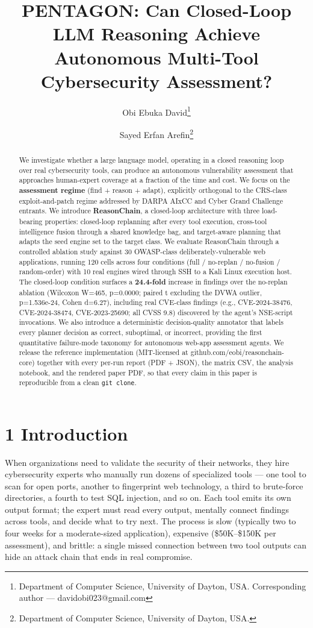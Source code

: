 \documentclass[
]{article}
\title{PENTAGON: Can Closed-Loop LLM Reasoning Achieve Autonomous
Multi-Tool Cybersecurity Assessment?}
\author{Obi Ebuka David\footnote{Department of Computer Science,
  University of Dayton, USA. Corresponding author ---
  davidobi023@gmail.com} \and Sayed Erfan Arefin\footnote{Department of
  Computer Science, University of Dayton, USA.}}
\date{}
\begin{document}
\maketitle
\begin{abstract}
We investigate whether a large language model, operating in a closed
reasoning loop over real cybersecurity tools, can produce an autonomous
vulnerability assessment that approaches human-expert coverage at a
fraction of the time and cost. We focus on the \textbf{assessment
regime} (find + reason + adapt), explicitly orthogonal to the CRS-class
exploit-and-patch regime addressed by DARPA AIxCC and Cyber Grand
Challenge entrants. We introduce \textbf{ReasonChain}, a closed-loop
architecture with three load-bearing properties: closed-loop replanning
after every tool execution, cross-tool intelligence fusion through a
shared knowledge bag, and target-aware planning that adapts the seed
engine set to the target class. We evaluate ReasonChain through a
controlled ablation study against 30 OWASP-class deliberately-vulnerable
web applications, running 120 cells across four conditions (full /
no-replan / no-fusion / random-order) with 10 real engines wired through
SSH to a Kali Linux execution host. The closed-loop condition surfaces a
\textbf{24.4-fold} increase in findings over the no-replan ablation
(Wilcoxon W=465, p=0.0000; paired t excluding the DVWA outlier,
p=1.536e-24, Cohen d=6.27), including real CVE-class findings (e.g.,
CVE-2024-38476, CVE-2024-38474, CVE-2023-25690; all CVSS 9.8) discovered
by the agent's NSE-script invocations. We also introduce a deterministic
decision-quality annotator that labels every planner decision as
correct, suboptimal, or incorrect, providing the first quantitative
failure-mode taxonomy for autonomous web-app assessment agents. We
release the reference implementation (MIT-licensed at
github.com/eobi/reasonchain-core) together with every per-run report
(PDF + JSON), the matrix CSV, the analysis notebook, and the rendered
paper PDF, so that every claim in this paper is reproducible from a
clean \texttt{git\ clone}.
\end{abstract}

\section{1 Introduction}\label{introduction}

When organizations need to validate the security of their networks, they
hire cybersecurity experts who manually run dozens of specialized tools
--- one tool to scan for open ports, another to fingerprint web
technology, a third to brute-force directories, a fourth to test SQL
injection, and so on. Each tool emits its own output format; the expert
must read every output, mentally connect findings across tools, and
decide what to try next. The process is slow (typically two to four
weeks for a moderate-sized application), expensive (\$50K--\$150K per
assessment), and brittle: a single missed connection between two tool
outputs can hide an attack chain that ends in real compromise.
\end{document}
